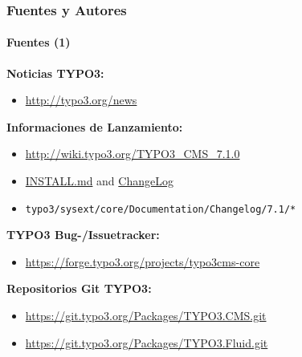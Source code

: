 \begin{frame}[fragile]
	\frametitle{Fuentes y Autores}
	\framesubtitle{Fuentes (1)}

	\textbf{Noticias TYPO3:}
		\begin{itemize}\smaller
			\item \url{http://typo3.org/news}
		\end{itemize}

	\textbf{Informaciones de Lanzamiento:}
		\begin{itemize}\smaller
			\item \url{http://wiki.typo3.org/TYPO3_CMS_7.1.0}
			\item \href{https://github.com/TYPO3/TYPO3.CMS/blob/master/INSTALL.md}{INSTALL.md} and \href{https://github.com/TYPO3/TYPO3.CMS/blob/master/ChangeLog}{ChangeLog}
			\item \texttt{typo3/sysext/core/Documentation/Changelog/7.1/*}
		\end{itemize}

	\textbf{TYPO3 Bug-/Issuetracker:}
		\begin{itemize}\smaller
			\item \url{https://forge.typo3.org/projects/typo3cms-core}
		\end{itemize}

	\textbf{Repositorios Git TYPO3:}
		\begin{itemize}\smaller
			\item \url{https://git.typo3.org/Packages/TYPO3.CMS.git}
			\item \url{https://git.typo3.org/Packages/TYPO3.Fluid.git}
		\end{itemize}

\end{frame}


